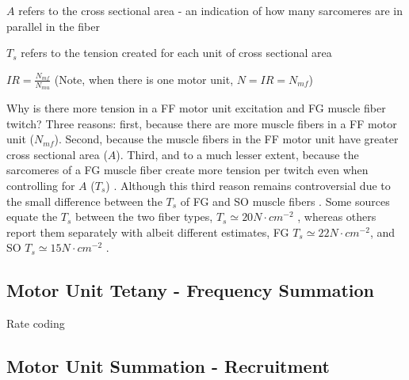 $A$ refers to the cross sectional area - an indication of how many sarcomeres are in parallel in the fiber

$T_s$ refers to the tension created for each unit of cross sectional area

$IR = \frac{N_{mf}}{N_{mu}}$ (Note, when there is one motor unit, $N = IR = N_{mf}$)

Why is there more tension in a FF motor unit excitation and FG muscle fiber twitch? Three reasons: first, because there are more muscle fibers in a FF motor unit ($N_{mf}$). Second, because the muscle fibers in the FF motor unit have greater cross sectional area ($A$). Third, and to a much lesser extent, because the sarcomeres of a FG muscle fiber create more tension per twitch even when controlling for $A$ ($T_s$) \cite{bodine_maximal_1987}. Although this third reason remains controversial due to the small difference between the $T_s$ of FG and SO muscle fibers \cite{lieber_skeletal_2010}. Some sources equate the $T_s$ between the two fiber types, $T_s \simeq 20 N \cdot cm^{-2}$ \cite{feher_quantitative_2017}, whereas others report them separately with albeit different estimates, FG $T_s \simeq 22 N \cdot cm^{-2}$, and SO $T_s \simeq 15 N \cdot cm^{-2}$ \cite{lieber_skeletal_2010}.






\subsection{Motor Unit Tetany - Frequency Summation}

Rate coding





\subsection{Motor Unit Summation - Recruitment}

